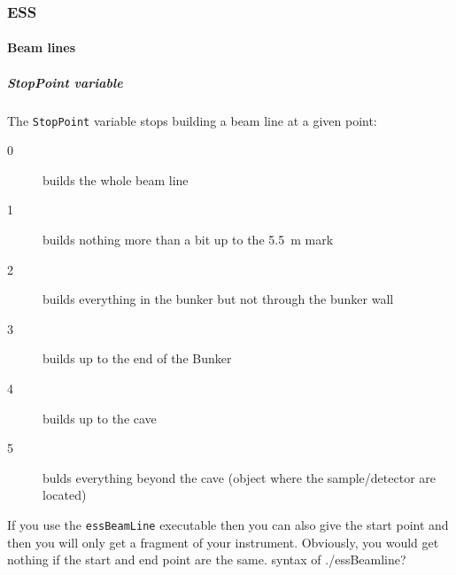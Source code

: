 \subsubsection{ESS}
\label{sec:model:ess}

\paragraph{Beam lines}
\label{sec:model:ess:beam-lines}

\subparagraph{StopPoint variable}
\label{sec:model:ess:beam-lines:StopPoint}
The {\tt StopPoint} variable stops building a beam line at a given point:
\begin{description}
\item[0] builds the whole beam line
\item[1] builds nothing more than a bit up to the \SI{5.5}{\meter} mark
\item[2] builds everything in the bunker but not through the bunker wall
\item[3] builds up to the end of the Bunker
\item[4] builds up to the cave %
\item[5] bulds everything beyond the cave (object where the sample/detector are located)
\end{description}

If you use the {\tt essBeamLine} executable then you can also give the start point
and then you will only get a fragment of your instrument.
Obviously, you would get nothing if the start and end point are the same.
\alert{syntax of ./essBeamline?}